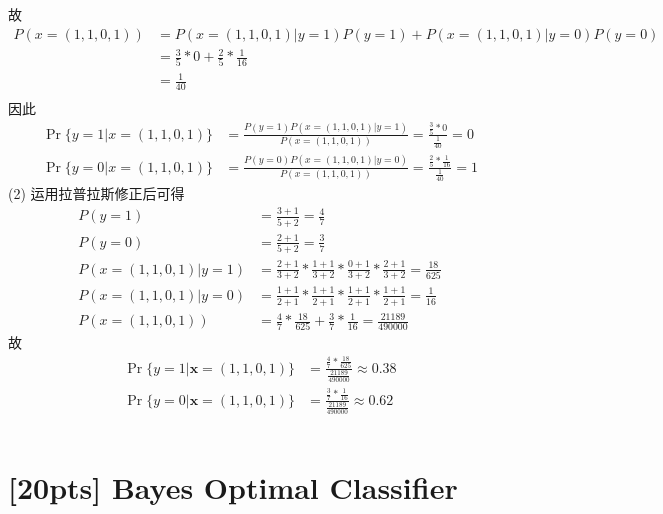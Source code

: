 \documentclass{article}
\begin{document}
		故
		\begin{equation*}
		\begin{aligned}
		P(x=(1,1,0,1)) 
		&= P(x=(1,1,0,1)|y=1)P(y=1) + P(x=(1,1,0,1)|y=0)P(y=0) \\
		&= \frac{3}{5}*0 + \frac{2}{5}*\frac{1}{16} \\
		&= \frac{1}{40} \\
		\end{aligned}
		\end{equation*}
		因此
		\begin{equation*}
		\begin{aligned}
		\Pr\{ y=1 | x=(1,1,0,1) \} &= \frac{P(y=1)P(x=(1,1,0,1)|y=1)}{P(x=(1,1,0,1))} = \frac{\frac{3}{5}*0}{\frac{1}{40}} = 0 \\
		\Pr\{ y=0 | x=(1,1,0,1) \} &= \frac{P(y=0)P(x=(1,1,0,1)|y=0)}{P(x=(1,1,0,1))} = \frac{\frac{2}{5}*\frac{1}{16}}{\frac{1}{40}} = 1
		\end{aligned}
		\end{equation*}
	(2) 运用拉普拉斯修正后可得
		\begin{equation*}
		\begin{aligned}
		P(y=1) &= \frac{3+1}{5+2} = \frac{4}{7} \\
		P(y=0) &= \frac{2+1}{5+2} = \frac{3}{7} \\
		P(x=(1,1,0,1)|y=1) &= \frac{2+1}{3+2}*\frac{1+1}{3+2}*\frac{0+1}{3+2}*\frac{2+1}{3+2} = \frac{18}{625}\\
		P(x=(1,1,0,1)|y=0) &= \frac{1+1}{2+1}*\frac{1+1}{2+1}*\frac{1+1}{2+1}*\frac{1+1}{2+1} = \frac{1}{16} \\
		P(x=(1,1,0,1)) &= \frac{4}{7} * \frac{18}{625} + \frac{3}{7} * \frac{1}{16} = \frac{21189}{490000}
		\end{aligned}
		\end{equation*}
		故
		\begin{equation*}
		\begin{aligned}
		\Pr\{ y=1 | \mathbf{x}=(1,1,0,1) \} &= \frac{\frac{4}{7}*\frac{18}{625}}{\frac{21189}{490000}} \approx 0.38 \\
		\Pr\{ y=0 | \mathbf{x}=(1,1,0,1) \} &= \frac{\frac{3}{7}*\frac{1}{16}}{\frac{21189}{490000}} \approx 0.62 \\\\
		\end{aligned}
		\end{equation*}
		
			
	\section{[20pts] Bayes Optimal Classifier}
	
\end{document}
